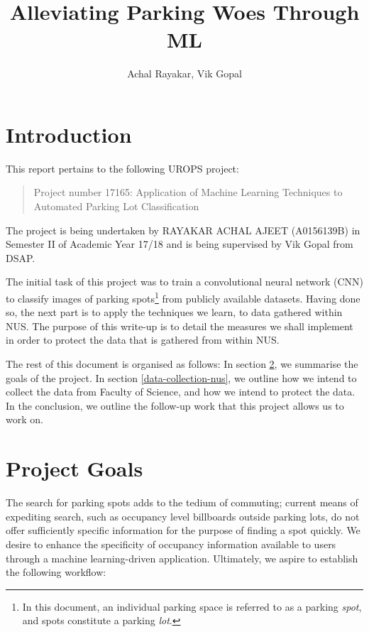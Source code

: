 \documentclass[]{article}
\title{\textbf{Alleviating Parking Woes Through ML}}
\author{Achal Rayakar, Vik Gopal}
\date{}
\let\rmarkdownfootnote\footnote%
\def\footnote{\protect\rmarkdownfootnote}
\begin{document}
\maketitle

{
\hypersetup{linkcolor=black}
\setcounter{tocdepth}{2}
\tableofcontents
}

\section{Introduction}

This report pertains to the following UROPS project:
\begin{quote}
Project number 17165: Application of
Machine Learning Techniques to Automated Parking Lot Classification
\end{quote}
The project is being undertaken by RAYAKAR ACHAL AJEET (A0156139B) in Semester II
of Academic Year 17/18 and is being supervised by Vik Gopal from DSAP. 

The initial task of this project was to train a convolutional neural network
(CNN) to classify images of parking spots\footnote{In this document, an
individual parking space is referred to as a parking \emph{spot}, and spots
constitute a parking \emph{lot}.} from publicly available datasets.  Having
done so, the next part is to apply the techniques we learn, to data gathered
within NUS. The purpose of this write-up is to detail the measures we shall
implement in order to protect the data that is gathered from within NUS.

The rest of this document is organised as follows: In section
\ref{project-goals}, we summarise the goals of the project. In section
\ref{data-collection-nus}, we outline how we intend to collect the data from
Faculty of Science, and how we intend to protect the data. In the conclusion,
we outline the follow-up work that this project allows us to work on.

\section{Project Goals}
\label{project-goals}

The search for parking spots adds to the tedium of commuting; current
means of expediting search, such as occupancy level billboards outside
parking lots, do not offer sufficiently specific information for the
purpose of finding a spot quickly. We desire to enhance the specificity
of occupancy information available to users through a machine
learning-driven application. Ultimately, we aspire to establish the
following workflow: \newline
\end{document}
